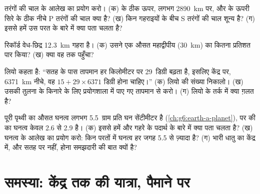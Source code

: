 \begin{exercise}[$\star\star$]\label{exo:g6:inside-the-earth:9}
तरंगों की चाल के आलेख का प्रयोग करो। (क)  के ठीक ऊपर, लगभग 2890~km पर, और
 के ऊपरी सिरे के ठीक नीचे P तरंगों की चाल क्या है?
(ख) किन गहराइयों के बीच S तरंगों की चाल शून्य है? (ग) इससे हमें
उस परत के बारे में क्या पता चलता है?
\end{exercise}

\begin{exercise}[$\star\star$]\label{exo:g6:inside-the-earth:10}
रिकॉर्ड वेध-छिद्र 12.3~km गहरा है। (क) उसने एक औसत
महाद्वीपीय  (30~km) का कितना प्रतिशत पार किया? (ख) क्या वह  तक पहुँचा?
\end{exercise}

\begin{exercise}[$\star\star\star$]\label{exo:g6:inside-the-earth:11}
लियो कहता है: ``सतह के पास तापमान हर किलोमीटर पर 29~डिग्री बढ़ता है,
इसलिए केंद्र पर, 6371~km नीचे, वह
$15 + 29 \times 6371$ डिग्री होना चाहिए।'' (क) लियो की संख्या निकालो। (ख) उसकी तुलना
 के किनारे के लिए प्रयोगशाला में पाए गए तापमान से करो। (ग) लियो के तर्क
में क्या ग़लत है?
\end{exercise}

\begin{exercise}[$\star\star\star$]\label{exo:g6:inside-the-earth:12}
पूरी पृथ्वी का औसत घनत्व लगभग 5.5~ग्राम प्रति घन
सेंटीमीटर है (\cref{ch:g6:earth-a-planet}), पर  की  का
घनत्व केवल 2.6 से 2.9 है। (क) इससे हमें और गहरे के पदार्थ के बारे में क्या पता
चलता है? (ख) घनत्व के आलेख का प्रयोग करो: किन परतों में घनत्व हर जगह 5.5 से ज़्यादा है? (ग) भारी धातु का केंद्र में, और सतह पर नहीं,
होना समझदारी की बात क्यों है?
\end{exercise}

\section{समस्या: केंद्र तक की यात्रा, पैमाने पर}

